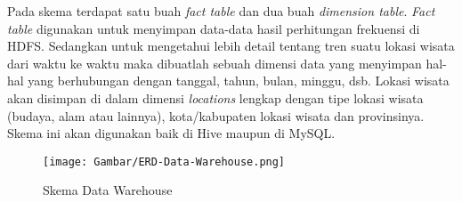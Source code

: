 Pada skema terdapat satu buah \textit{fact table} dan dua buah \textit{dimension table}. \textit{Fact table} digunakan untuk menyimpan data-data hasil perhitungan frekuensi di HDFS. Sedangkan untuk mengetahui lebih detail tentang tren suatu lokasi wisata dari waktu ke waktu maka dibuatlah sebuah dimensi data yang menyimpan hal-hal yang berhubungan dengan tanggal, tahun, bulan, minggu, dsb. Lokasi wisata akan disimpan di dalam dimensi \textit{locations} lengkap dengan tipe lokasi wisata (budaya, alam atau lainnya), kota/kabupaten lokasi wisata dan provinsinya. Skema ini akan digunakan baik di Hive maupun di MySQL.

\begin{figure}[H]
	\centering
	\texttt{[image: Gambar/ERD-Data-Warehouse.png]}
	\caption[Skema Data Warehouse]{Skema Data Warehouse} 
	\label{fig:erd_data_warehouse}
\end{figure}
